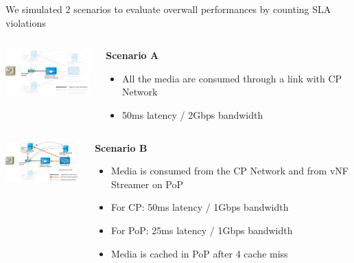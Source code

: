 \documentclass[a4paper]{beamer}
\begin{document}
\begin{frame}{We simulated 2 scenarios to evaluate overwall performances by counting SLA violations}
	
			

		\begin{columns}[T]
		\begin{column}[T]{0.33 \textwidth} 
			
			\includegraphics[width=10em]{highleveldesign1.png}
		\end{column}
										
		\begin{column}[T]{0.66\textwidth} 
										  
			\textbf{Scenario A}
			\begin{itemize}
				\item All the media are consumed through a link with CP Network
				\item 50ms latency / 2Gbps bandwidth
			\end{itemize}
			\vspace{3mm}
			
		\end{column}
																										
	\end{columns}
	
		\begin{columns}[T]
		\begin{column}[T]{0.33 \textwidth} 
		\vspace{2em}
			\includegraphics[width=10em]{highleveldesign7bis.png}
		\end{column}
										
		\begin{column}[T]{0.66\textwidth} 
										  
			\textbf{Scenario B}
			\begin{itemize}
				\item Media is consumed from the CP Network and from vNF Streamer on PoP
				\item For CP: 50ms latency / 1Gbps bandwidth
				\item For PoP: 25ms latency / 1Gbps bandwidth
				\item Media is cached in PoP after 4 cache miss
			\end{itemize}
			
		\end{column}
																										
	\end{columns}
	
	
	
\end{frame}
\end{document}
